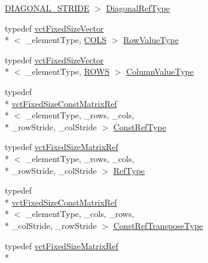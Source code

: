 \begin{DoxyCompactItemize}
\hyperlink{classvct_fixed_size_const_matrix_base_ad4ad7a7ed23628b65949dbbf56d388f4aa23755b132b8c416884bd2e751ea69ca}{D\-I\-A\-G\-O\-N\-A\-L\-\_\-\-S\-T\-R\-I\-D\-E} $>$ \hyperlink{classvct_fixed_size_const_matrix_base_ae0b335e845233b49e01f24c1518ee6a1}{Diagonal\-Ref\-Type}
\item 
typedef \hyperlink{classvct_fixed_size_vector}{vct\-Fixed\-Size\-Vector}\\*
$<$ \-\_\-element\-Type, \hyperlink{classvct_fixed_size_const_matrix_base_a05da4a844e1880e31d3052abb9a8063ba99583531bd0415ad92eed81fc931d592}{C\-O\-L\-S} $>$ \hyperlink{classvct_fixed_size_const_matrix_base_a085661aab062c6d975e558be1cfae2d7}{Row\-Value\-Type}
\item 
typedef \hyperlink{classvct_fixed_size_vector}{vct\-Fixed\-Size\-Vector}\\*
$<$ \-\_\-element\-Type, \hyperlink{classvct_fixed_size_const_matrix_base_a05da4a844e1880e31d3052abb9a8063ba628eeb65016492a84b40dad539262735}{R\-O\-W\-S} $>$ \hyperlink{classvct_fixed_size_const_matrix_base_a1c4e4fda1ae603282d28745d3ec78493}{Column\-Value\-Type}
\item 
typedef \\*
\hyperlink{classvct_fixed_size_const_matrix_ref}{vct\-Fixed\-Size\-Const\-Matrix\-Ref}\\*
$<$ \-\_\-element\-Type, \-\_\-rows, \-\_\-cols, \\*
\-\_\-row\-Stride, \-\_\-col\-Stride $>$ \hyperlink{classvct_fixed_size_const_matrix_base_a457385fe6e0a82182be90728b60cca79}{Const\-Ref\-Type}
\item 
typedef \hyperlink{classvct_fixed_size_matrix_ref}{vct\-Fixed\-Size\-Matrix\-Ref}\\*
$<$ \-\_\-element\-Type, \-\_\-rows, \-\_\-cols, \\*
\-\_\-row\-Stride, \-\_\-col\-Stride $>$ \hyperlink{classvct_fixed_size_const_matrix_base_a9745538b98120d767fe2b9a9ba984e80}{Ref\-Type}
\item 
typedef \\*
\hyperlink{classvct_fixed_size_const_matrix_ref}{vct\-Fixed\-Size\-Const\-Matrix\-Ref}\\*
$<$ \-\_\-element\-Type, \-\_\-cols, \-\_\-rows, \\*
\-\_\-col\-Stride, \-\_\-row\-Stride $>$ \hyperlink{classvct_fixed_size_const_matrix_base_a41d41a9a3dc6d0c8e36348a8c2fc83db}{Const\-Ref\-Transpose\-Type}
\item 
typedef \hyperlink{classvct_fixed_size_matrix_ref}{vct\-Fixed\-Size\-Matrix\-Ref}\\*

\end{DoxyCompactItemize}
